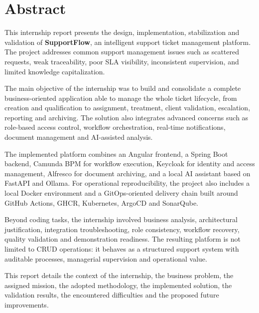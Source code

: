 \chapter*{Abstract}

This internship report presents the design, implementation, stabilization and validation of \textbf{SupportFlow}, an intelligent support ticket management platform. The project addresses common support management issues such as scattered requests, weak traceability, poor SLA visibility, inconsistent supervision, and limited knowledge capitalization.

The main objective of the internship was to build and consolidate a complete business-oriented application able to manage the whole ticket lifecycle, from creation and qualification to assignment, treatment, client validation, escalation, reporting and archiving. The solution also integrates advanced concerns such as role-based access control, workflow orchestration, real-time notifications, document management and AI-assisted analysis.

The implemented platform combines an Angular frontend, a Spring Boot backend, Camunda BPM for workflow execution, Keycloak for identity and access management, Alfresco for document archiving, and a local AI assistant based on FastAPI and Ollama. For operational reproducibility, the project also includes a local Docker environment and a GitOps-oriented delivery chain built around GitHub Actions, GHCR, Kubernetes, ArgoCD and SonarQube.

Beyond coding tasks, the internship involved business analysis, architectural justification, integration troubleshooting, role consistency, workflow recovery, quality validation and demonstration readiness. The resulting platform is not limited to CRUD operations: it behaves as a structured support system with auditable processes, managerial supervision and operational value.

This report details the context of the internship, the business problem, the assigned mission, the adopted methodology, the implemented solution, the validation results, the encountered difficulties and the proposed future improvements.
